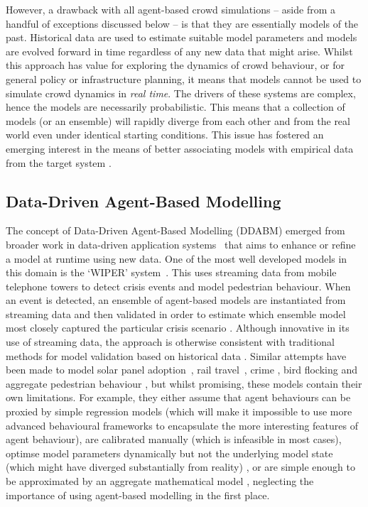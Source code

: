 However, a drawback with all agent-based crowd simulations -- aside from a handful of exceptions discussed below --  is that they are essentially models of the past. Historical data are used to estimate suitable model parameters and models are evolved forward in time regardless of any new data that might arise. Whilst this approach has value for exploring the dynamics of crowd behaviour, or for general policy or infrastructure planning, it means that models cannot be used to simulate crowd dynamics in \textit{real time}. The drivers of these systems are complex, hence the models are necessarily probabilistic.  This means that a collection of models (or an ensemble) will rapidly diverge from each other and from the real world even under identical starting conditions. This issue has fostered an emerging interest in the means of better associating models with empirical data from the target system \citep[see, e.g.,][]{wang_data_2015, ward_dynamic_2016, long_spatial_2017}. 


\subsection{Data-Driven Agent-Based Modelling}

The concept of Data-Driven Agent-Based Modelling (DDABM) emerged from broader work in data-driven application systems~\citep{darema_dynamic_2004} that aims to enhance or refine a model at runtime using new data. One of the most well developed models in this domain is the `WIPER' system~\citep{schoenharl_design_2011}.  This uses streaming data from mobile telephone towers to detect crisis events and model pedestrian behaviour.  When an event is detected, an ensemble of agent-based models are instantiated from streaming data and then validated in order to estimate which ensemble model most closely captured the particular crisis scenario \citep{schoenharl_evaluation_2008}. Although innovative in its use of streaming data, the approach is otherwise consistent with traditional methods for model validation based on historical data \citep{oloo_adaptive_2017a}. Similar attempts have been made to model solar panel adoption~\citep{zhang_datadriven_2015}, rail travel~\citep{othman_datadriven_2015}, crime \citep{lloyd_exploring_2016}, bird flocking \citep{oloo_predicting_2018} and aggregate pedestrian behaviour \citep{ward_dynamic_2016}, but whilst promising, these models contain their own limitations. For example, they either assume that agent behaviours can be proxied by simple regression models \citep{zhang_datadriven_2015} (which will make it impossible to use more advanced behavioural frameworks to encapsulate the more interesting features of agent behaviour), are calibrated manually \citep{othman_datadriven_2015} (which is infeasible in most cases), optimse model parameters dynamically but not the underlying model state (which might have diverged substantially from reality) \citep{oloo_predicting_2018}, or are simple enough to be approximated by an aggregate mathematical model \citep{lloyd_exploring_2016, ward_dynamic_2016}, neglecting the importance of using agent-based modelling in the first place.

